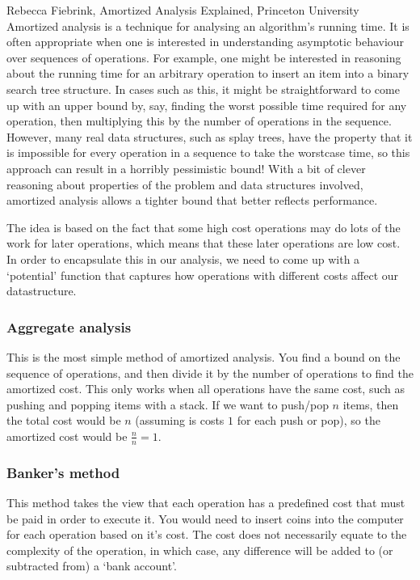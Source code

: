 \begin{aquote}{Rebecca Fiebrink, Amortized Analysis Explained, Princeton University}
  Amortized analysis is a technique for analysing an algorithm's running time.
  It is often appropriate when one is interested in understanding asymptotic
  behaviour over sequences of operations. For example, one might be interested in
  reasoning about the running time for an arbitrary operation to insert an item
  into a binary search tree structure. In cases such as this, it might be
  straightforward to come up with an upper bound by, say, finding the
  worst possible time required for any operation, then multiplying this by the
  number of operations in the sequence. However, many real data structures, such
  as splay trees, have the property that it is impossible for every operation in
  a sequence to take the worstcase time, so this approach can result in a
  horribly pessimistic bound! With a bit of clever reasoning about properties of
  the problem and data structures involved, amortized analysis allows a tighter
  bound that better reflects performance.
\end{aquote}

The idea is based on the fact that some high cost operations may do lots of the
work for later operations, which means that these later operations are low cost.
In order to encapsulate this in our analysis, we need to come up with a
`potential' function that captures how operations with different costs affect
our datastructure.

\subsubsection{Aggregate analysis}

This is the most simple method of amortized analysis. You find a bound on the
sequence of operations, and then divide it by the number of operations to find
the amortized cost. This only works when all operations have the same cost, such
as pushing and popping items with a stack. If we want to push/pop $n$ items,
then the total cost would be $n$ (assuming is costs $1$ for each push or pop),
so the amortized cost would be $\frac{n}{n} = 1$.

\subsubsection{Banker's method}

This method takes the view that each operation has a predefined cost that must
be paid in order to execute it. You would need to insert coins into the computer
for each operation based on it's cost. The cost does not necessarily equate to
the complexity of the operation, in which case, any difference will be added to
(or subtracted from) a `bank account'.

